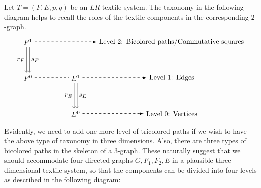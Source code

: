 \documentclass[a4paper,reqno,12pt]{amsart}
\theoremstyle{definition}
\theoremstyle{remark}
\begin{document}
Let $T=(F,E,p,q)$ be an $LR$-textile system. The taxonomy in the following diagram helps to recall the roles of the textile components in the corresponding $2$-graph. 
\[
\begin{tikzpicture}[scale=1.2]
\node[] (A) at (0,1.5) {$F^1$};
\node[] (B) at (0,0) {$F^0$};	
\node[] (C) at (2,0) {$E^1$};
\node[] (D) at (2,-1.5) {$E^0$};

\node[] (E) at (6,-1.5) {\text{Level 0: Vertices}};
\node[] (F) at (6,0) {Level 1: Edges};
\node[] (G) at (6,1.5) {Level 2: Bicolored paths/Commutative squares};

\draw[transform canvas={xshift=0.5ex}, ->] (A) -- (B);
\draw[transform canvas={xshift=-0.5ex}, ->] (A) -- (B);

\draw[transform canvas={xshift=0.5ex}, ->] (C) -- (D);
\draw[transform canvas={xshift=-0.5ex}, ->] (C) -- (D);

\draw[dashed, thick] (B) -- (C);

\path[->, dashed, >=latex,thick] (A) edge [left] node {} (G);
\path[->, dashed, >=latex,thick] (C) edge [left] node {} (F);
\path[->, dashed, >=latex,thick] (D) edge [left] node {} (E);

\node at (-0.3,0.75) {$r_F$};
\node at (0.3,0.75) {$s_F$};

\node at (1.7,-0.75) {$r_E$};
\node at (2.3,-0.75) {$s_E$};
\end{tikzpicture}
\] 
Evidently, we need to add one more level of tricolored paths if we wish to have the above type of taxonomy in three dimensions. Also, there are three types of bicolored paths in the skeleton of a $3$-graph. These naturally suggest that we should accommodate four directed graphs $G,F_1,F_2,E$ in a plausible three-dimensional textile system, so that the components can be divided into four levels as described in the following diagram:
\end{document}
